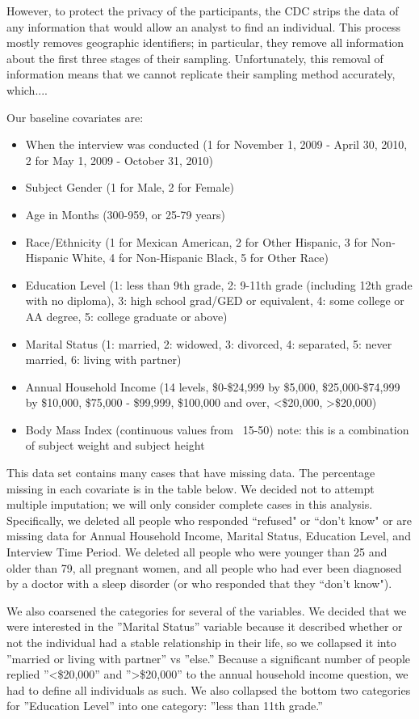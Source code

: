 \documentclass{article}
\begin{document}
However, to protect the privacy of the participants, the CDC strips the data of any information that would allow an analyst to find an individual.  This process mostly removes geographic identifiers; in particular, they remove all information about the first three stages of their sampling.  Unfortunately, this removal of information means that we cannot replicate their sampling method accurately, which....

Our baseline covariates are:
\begin{itemize}
\item When the interview was conducted (1 for November 1, 2009 - April 30, 2010, 2 for May 1, 2009 - October 31, 2010)
\item Subject Gender (1 for Male, 2 for Female)
\item Age in Months (300-959, or 25-79 years)
\item Race/Ethnicity (1 for Mexican American, 2 for Other Hispanic, 3 for Non-Hispanic White, 4 for Non-Hispanic Black, 5 for Other Race)
\item Education Level (1: less than 9th grade, 2: 9-11th grade (including 12th grade with no diploma), 3: high school grad/GED or equivalent, 4: some college or AA degree, 5: college graduate or above)
\item Marital Status (1: married, 2: widowed, 3: divorced, 4: separated, 5: never married, 6: living with partner)
\item Annual Household Income (14 levels, \$0-\$24,999 by \$5,000, \$25,000-\$74,999 by \$10,000,  \$75,000 - \$99,999, \$100,000 and over, <\$20,000, >\$20,000)
\item Body Mass Index (continuous values from ~15-50) note: this is a combination of subject weight and subject height
\end{itemize}

This data set contains many cases that have missing data.  The percentage missing in each covariate is in the table below.  We decided not to attempt multiple imputation; we will only consider complete cases in this analysis.  Specifically, we deleted all people who responded ``refused" or ``don't know" or are missing data for Annual Household Income, Marital Status, Education Level, and Interview Time Period.  We deleted all people who were younger than 25 and older than 79, all pregnant women, and all people who had ever been diagnosed by a doctor with a sleep disorder (or who responded that they ``don't know").  

We also coarsened the categories for several of the variables.  We decided that we were interested in the ''Marital Status'' variable because it described whether or not the individual had a stable relationship in their life, so we collapsed it into ''married or living with partner'' vs ''else.''  Because a significant number of people replied ''<\$20,000'' and ''>\$20,000'' to the annual household income question, we had to define all individuals as such.  We also collapsed the bottom two categories for ''Education Level'' into one category: ''less than 11th grade.''
\end{document}
